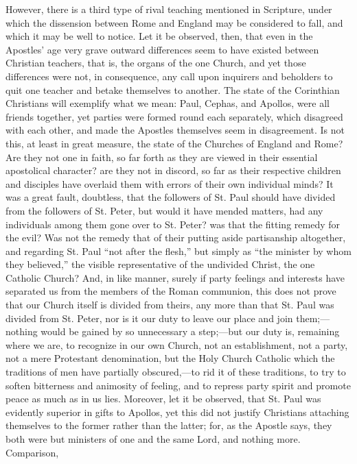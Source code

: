 However, there is a third type of rival teaching mentioned in
Scripture, under which the dissension between Rome and England may be
considered to fall, and which it may be well to notice. Let it be
observed, then, that even in the Apostles' age very grave outward
differences seem to have existed between Christian teachers, that is,
the organs of the one Church, and yet those differences were not, in
consequence, any call upon inquirers and beholders to quit one teacher
and betake themselves to another. The state of the Corinthian
Christians will exemplify what we mean: Paul, Cephas, and Apollos,
were all friends together, yet parties were formed round each
separately, which disagreed with each other, and made the Apostles
themselves seem in disagreement. Is not this, at least in great
measure, the state of the Churches of England and Rome? Are they not
one in faith, so far forth as they are viewed in their essential
apostolical character? are they not in discord, so far as their
respective children and disciples have overlaid them with errors of
their own individual minds? It was a great fault, doubtless, that the
followers of St. Paul should have divided from the followers of St.
Peter, but would it have mended matters, had any individuals among
them gone over to St. Peter? was that the fitting remedy for the evil?
Was not the remedy that of their putting aside partisanship
altogether, and regarding St. Paul ``not after the flesh,''
but simply as ``the minister by whom they believed,'' the
visible representative of the undivided Christ, the one Catholic
Church? And, in like manner, surely if party feelings and interests
have separated us from the members of the Roman communion, this does
not prove that our Church itself is divided from theirs, any more than
that St. Paul was divided from St. Peter, nor is it our duty to leave
our place and join them;—nothing would be gained by so unnecessary a
step;—but our duty is, remaining where we are, to recognize in our
own Church, not an establishment, not a party, not a mere Protestant
denomination, but the Holy Church Catholic which the traditions of men
have partially obscured,—to rid it of these traditions, to try to
soften bitterness and animosity of feeling, and to repress party
spirit and promote peace as much as in us lies. Moreover, let it be
observed, that St. Paul was evidently superior in gifts to Apollos,
yet this did not justify Christians attaching themselves to the former
rather than the latter; for, as the Apostle says, they both were
but ministers of one and the same Lord, and nothing more. Comparison,
